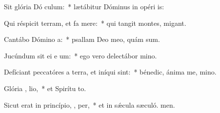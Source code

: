 \item Sit glória Dó  culum:~* lætábitur Dóminus in opéri is:
\item Qui réspicit terram, et fa  mere:~* qui tangit montes,  migant.
\item Cantábo Dómino   a:~* psallam Deo meo, quám sum.
\item Jucúndum sit ei e um:~* ego vero delectábor  mino.
\item Defíciant peccatóres a terra, et iníqui    sint:~* bénedic, ánima me, mino.
\item Glória ,  lio,~* et Spirítu to.
\item Sicut erat in princípio,  ,  per,~* et in sǽcula sæculó. men.
